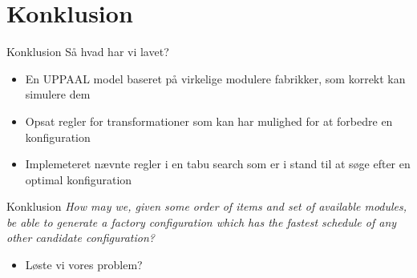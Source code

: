 \section{Konklusion}
\begin{frame}{Konklusion}
	Så hvad har vi lavet?
	\begin{itemize}
		\item En UPPAAL model baseret på virkelige modulere fabrikker, som korrekt kan simulere dem
		\item Opsat regler for transformationer som kan har mulighed for at forbedre en konfiguration
		\item Implemeteret nævnte regler i en tabu search som er i stand til at søge efter en optimal konfiguration
	\end{itemize}
\end{frame}

\begin{frame}{Konklusion}
	\textit{How may we, given some order of items and set of available modules, be able to generate a factory configuration which has the fastest schedule of any other candidate configuration?}
	\begin{itemize}
		\item Løste vi vores problem?
	\end{itemize}
\end{frame}



